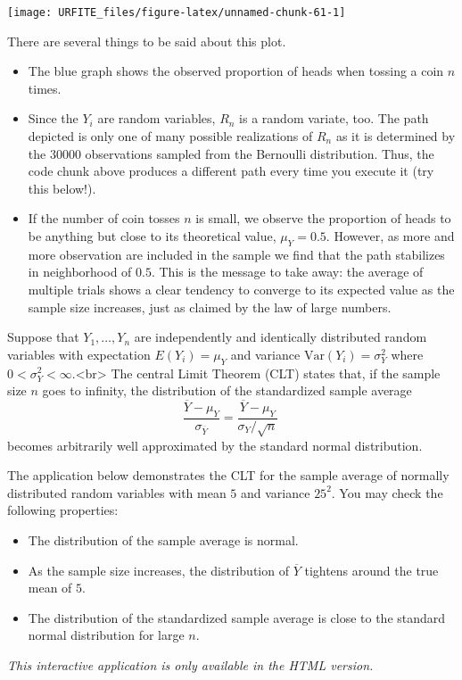 \documentclass[]{book}
\theoremstyle{definition}
\theoremstyle{definition}
\theoremstyle{definition}
\theoremstyle{remark}
\begin{document}
\begin{center}\texttt{[image: URFITE\_files/figure-latex/unnamed-chunk-61-1]} \end{center}

There are several things to be said about this plot.

\begin{itemize}
\item
  The blue graph shows the observed proportion of heads when tossing a
  coin \(n\) times.
\item
  Since the \(Y_i\) are random variables, \(R_n\) is a random variate,
  too. The path depicted is only one of many possible realizations of
  \(R_n\) as it is determined by the \(30000\) observations sampled from
  the Bernoulli distribution. Thus, the code chunk above produces a
  different path every time you execute it (try this below!).
\item
  If the number of coin tosses \(n\) is small, we observe the proportion
  of heads to be anything but close to its theoretical value,
  \(\mu_Y = 0.5\). However, as more and more observation are included in
  the sample we find that the path stabilizes in neighborhood of
  \(0.5\). This is the message to take away: the average of multiple
  trials shows a clear tendency to converge to its expected value as the
  sample size increases, just as claimed by the law of large numbers.
\end{itemize}

\begin{keyconcepts}{2.7}
Suppose that $Y_1,\dots,Y_n$ are independently and identically distributed random variables with expectation $E(Y_i)=\mu_Y$ and variance $\text{Var}(Y_i)=\sigma^2_Y$ where $0<\sigma^2_Y<\infty$.<br>
The central Limit Theorem (CLT) states that, if the sample size $n$ goes to infinity, the distribution of the standardized sample average 
$$ \frac{\overline{Y} - \mu_Y}{\sigma_{\overline{Y}}} = \frac{\overline{Y} - \mu_Y}{\sigma_Y/\sqrt{n}} \ $$
becomes arbitrarily well approximated by the standard normal distribution.

The application below demonstrates the CLT for the sample average of normally distributed random variables with mean $5$ and variance $25^2$. You may check the following properties:

\begin{itemize}
\item The distribution of the sample average is normal.
\item As the sample size increases, the distribution of $\overline{Y}$ tightens around the true mean of $5$.
\item The distribution of the standardized sample average is close to the standard normal distribution for large $n$.
\end{itemize}

\begin{center}
\textit{This interactive application is only available in the HTML version.}
\end{center}

\end{keyconcepts}
\end{document}
